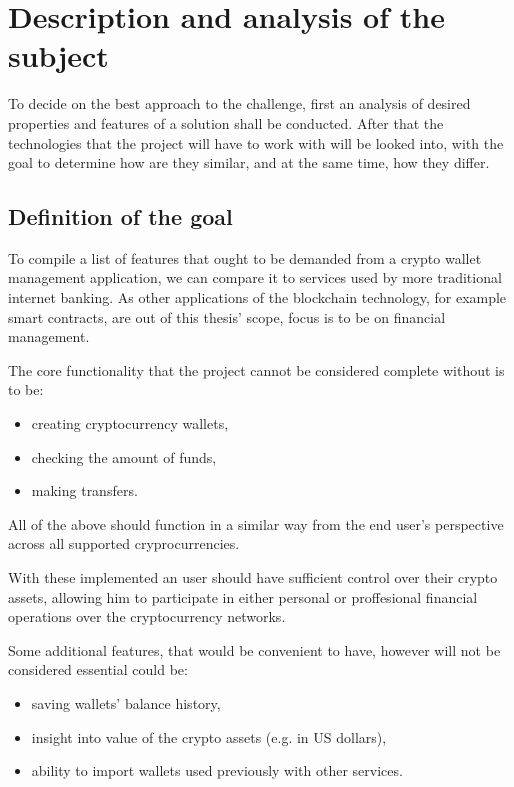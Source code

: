 \chapter{Description and analysis of the subject}

To decide on the best approach to the challenge,
first an analysis of desired properties and features of a solution
shall be conducted.
After that the technologies that the project will have to work with
will be looked into, with the goal to determine how are they similar,
and at the same time, how they differ.

\section{Definition of the goal}

To compile a list of features that ought to be demanded
from a crypto wallet management application,
we can compare it to services used by more traditional
internet banking.
As other applications of the blockchain technology,
for example smart contracts,
are out of this thesis' scope,
focus is to be on financial management.

The core functionality that the project cannot be considered complete without is to be:
\begin{itemize}
    \item creating cryptocurrency wallets,
    \item checking the amount of funds,
    \item making transfers.
\end{itemize}
All of the above should function in a similar way
from the end user's perspective
across all supported cryprocurrencies.

With these implemented an user should have sufficient control
over their crypto assets,
allowing him to participate in either personal or proffesional
financial operations over the cryptocurrency networks.

Some additional features, that would be convenient to have,
however will not be considered essential could be:
\begin{itemize}
    \item saving wallets' balance history,
    \item insight into value of the crypto assets (e.g. in US dollars),
    \item ability to import wallets used previously with other services.
\end{itemize}

